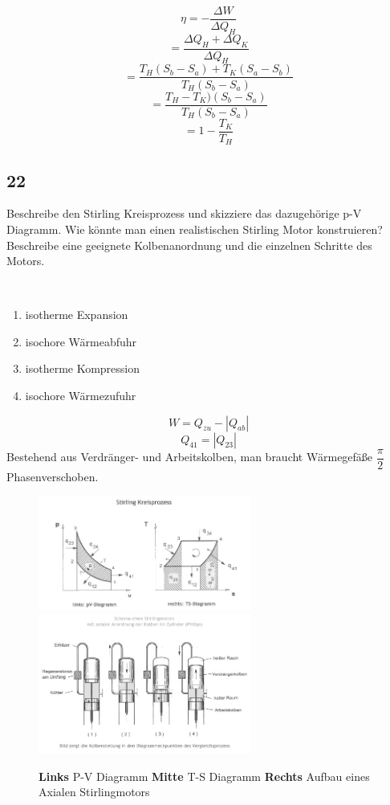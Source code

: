 $$\eta = - \dfrac{\Delta W}{ \Delta Q_H}$$ 
$$ = \dfrac{\Delta Q_H + \Delta Q_K}{\Delta Q_H}$$ $$= \dfrac{T_H(S_b-S_a) + T_K(S_a -S_b)}{T_H(S_b-S_a)}$$ 
$$=\dfrac{T_H-T_K)(S_b-S_a)}{T_H(S_b-S_a)}$$ 
$$ = 1 -\dfrac{T_K}{T_H}$$


\subsection{22}
\begin{myfrag}
Beschreibe den Stirling Kreisprozess und skizziere das dazugehörige p-V
Diagramm. Wie könnte man einen realistischen Stirling Motor konstruieren?
Beschreibe eine geeignete Kolbenanordnung und die einzelnen Schritte des
Motors.
\end{myfrag}
\quad \\
\begin{enumerate}
\item isotherme Expansion
\item isochore Wärmeabfuhr
\item isotherme Kompression
\item isochore Wärmezufuhr
\end{enumerate}
$$ W = Q_{zu}-|Q_{ab}|$$
$$Q_{41} = |Q_{23}|$$
Bestehend aus Verdränger- und Arbeitskolben, man braucht Wärmegefäße $\dfrac{\pi}{2} $ Phasenverschoben.
\begin{figure}
\includegraphics[width=7cm]{Bilder/Frage22pv.jpg} 
\includegraphics[width=7cm]{Bilder/Frage22Aufbau.jpg} 

\caption{\textbf{Links} P-V Diagramm \textbf{Mitte} T-S Diagramm \textbf{Rechts} Aufbau eines Axialen Stirlingmotors}
\end{figure}
